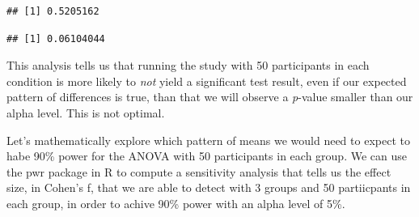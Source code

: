 \documentclass[]{book}
\newenvironment{Shaded}{\begin{snugshade}}{\end{snugshade}}
\newcommand{\CommentTok}[1]{\textcolor[rgb]{0.56,0.35,0.01}{\textit{#1}}}
\newcommand{\DataTypeTok}[1]{\textcolor[rgb]{0.13,0.29,0.53}{#1}}
\newcommand{\DecValTok}[1]{\textcolor[rgb]{0.00,0.00,0.81}{#1}}
\newcommand{\FloatTok}[1]{\textcolor[rgb]{0.00,0.00,0.81}{#1}}
\newcommand{\KeywordTok}[1]{\textcolor[rgb]{0.13,0.29,0.53}{\textbf{#1}}}
\newcommand{\NormalTok}[1]{#1}
\newcommand{\OperatorTok}[1]{\textcolor[rgb]{0.81,0.36,0.00}{\textbf{#1}}}
\newcommand{\StringTok}[1]{\textcolor[rgb]{0.31,0.60,0.02}{#1}}
\begin{document}
\begin{verbatim}
## [1] 0.5205162
\end{verbatim}

\begin{Shaded}
\end{Shaded}

\begin{verbatim}
## [1] 0.06104044
\end{verbatim}

This analysis tells us that running the study with 50 participants in each condition is more likely to \emph{not} yield a significant test result, even if our expected pattern of differences is true, than that we will observe a \emph{p}-value smaller than our alpha level. This is not optimal.

Let's mathematically explore which pattern of means we would need to expect to habe 90\% power for the ANOVA with 50 participants in each group. We can use the pwr package in R to compute a sensitivity analysis that tells us the effect size, in Cohen's f, that we are able to detect with 3 groups and 50 partiicpants in each group, in order to achive 90\% power with an alpha level of 5\%.

\begin{Shaded}
\end{Shaded}
\end{document}
